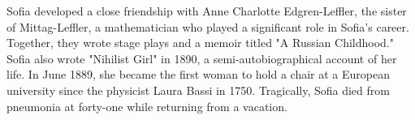 \documentclass[12pt,a4paper]{article}
\begin{document}
Sofia developed a close friendship with Anne Charlotte Edgren-Leffler, the sister of Mittag-Leffler, a mathematician who played a significant role in Sofia's career. Together, they wrote stage plays and a memoir titled "A Russian Childhood." Sofia also wrote "Nihilist Girl" in 1890, a semi-autobiographical account of her life. In June 1889, she became the first woman to hold a chair at a European university since the physicist Laura Bassi in 1750. Tragically, Sofia died from pneumonia at forty-one while returning from a vacation.






%
%
\end{document}
